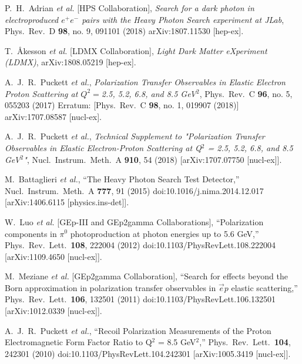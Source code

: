 \documentclass[11pt]{article}
\begin{document}
    \begin{thebibliography}{99}

            P.~H.~Adrian {\it et al.} [HPS Collaboration],
            \emph{Search for a dark photon in electroproduced $e^{+}e^{-}$ pairs with the Heavy Photon Search experiment at JLab},
            Phys.\ Rev.\ D {\bf 98}, no. 9, 091101 (2018)
            arXiv:1807.11530 [hep-ex].
        
            T.~Åkesson {\it et al.} [LDMX Collaboration],
            \emph{Light Dark Matter eXperiment (LDMX)},
            arXiv:1808.05219 [hep-ex].

            A.~J.~R.~Puckett {\it et al.},
            \emph{Polarization Transfer Observables in Elastic Electron Proton Scattering at $Q^2 = $2.5, 5.2, 6.8, and 8.5 GeV$^2$},
            Phys.\ Rev.\ C {\bf 96}, no. 5, 055203 (2017)
            Erratum: [Phys.\ Rev.\ C {\bf 98}, no. 1, 019907 (2018)]
            arXiv:1707.08587 [nucl-ex].

            A.~J.~R.~Puckett {\it et al.},
            \emph{Technical Supplement to "Polarization Transfer Observables in Elastic Electron-Proton Scattering at Q$^2$ = 2.5, 5.2, 6.8, and 8.5 GeV$^2$"},
            Nucl.\ Instrum.\ Meth.\ A {\bf 910}, 54 (2018)
            [arXiv:1707.07750 [nucl-ex]].

            M.~Battaglieri {\it et al.},
            ``The Heavy Photon Search Test Detector,''
            Nucl.\ Instrum.\ Meth.\ A {\bf 777}, 91 (2015)
            doi:10.1016/j.nima.2014.12.017
            [arXiv:1406.6115 [physics.ins-det]].

            W.~Luo {\it et al.} [GEp-III and GEp2gamma Collaborations],
            ``Polarization components in $\pi^{0}$ photoproduction at photon energies up to 5.6 GeV,''
            Phys.\ Rev.\ Lett.\  {\bf 108}, 222004 (2012)
            doi:10.1103/PhysRevLett.108.222004
            [arXiv:1109.4650 [nucl-ex]].

            M.~Meziane {\it et al.} [GEp2gamma Collaboration],
            ``Search for effects beyond the Born approximation in polarization transfer observables in $\vec{e}p$ elastic scattering,''
            Phys.\ Rev.\ Lett.\  {\bf 106}, 132501 (2011)
            doi:10.1103/PhysRevLett.106.132501
            [arXiv:1012.0339 [nucl-ex]].

            A.~J.~R.~Puckett {\it et al.},
            ``Recoil Polarization Measurements of the Proton Electromagnetic Form Factor Ratio to Q$^2$ = 8.5 GeV$^2$,''
            Phys.\ Rev.\ Lett.\  {\bf 104}, 242301 (2010)
            doi:10.1103/PhysRevLett.104.242301
            [arXiv:1005.3419 [nucl-ex]].

    \end{thebibliography}
    \nocite{*}
\end{document}
